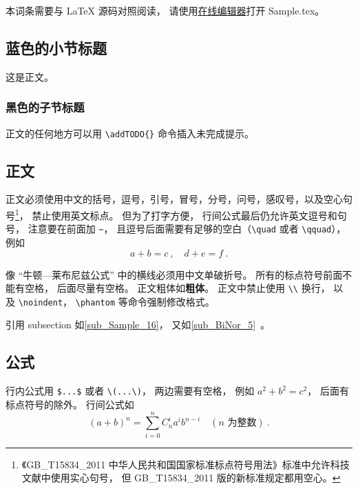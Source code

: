 
\begin{issues}
\issueDraft       %
\issueTODO        %
\issueMissDepend  %
\issueAbstract    %
\issueNeedCite    %
\end{issues}


本词条需要与 LaTeX 源码对照阅读， 请使用\href{https://wuli.wiki/editor}{在线编辑器}打开 Sample.tex。

\subsection{蓝色的小节标题}
这是正文。
\subsubsection{黑色的子节标题}
正文的任何地方可以用 \verb|\addTODO{}| 命令插入未完成提示。

\subsection{正文}\label{sub_Sample_16}
正文必须使用中文的括号，逗号，引号，冒号，分号，问号，感叹号，以及空心句号\footnote{《GB\_T15834\_2011 中华人民共和国国家标准标点符号用法》标准中允许科技文献中使用实心句号， 但 GB\_T15834\_2011 版的新标准规定都用空心。}， 禁止使用英文标点。 但为了打字方便， 行间公式最后仍允许英文逗号和句号， 注意要在前面加 \verb|~|， 且逗号后面需要有足够的空白（\verb|\quad| 或者 \verb|\qquad|）， 例如
\begin{equation}\label{eq_Sample_2}
a + b = c~, \quad d + e = f~.
\end{equation}

像 “牛顿—莱布尼兹公式” 中的横线必须用中文单破折号。 所有的标点符号前面不能有空格， 后面尽量有空格。 正文粗体如\textbf{粗体}。 正文中禁止使用 \verb|\\| 换行， 以及 \verb|\noindent|， \verb|\phantom| 等命令强制修改格式。

引用 subsection 如\autoref{sub_Sample_16}， 又如\autoref{sub_BiNor_5}~。

\subsection{公式}
行内公式用 \verb|$...$| 或者 \verb|\(...\)|， 两边需要有空格， 例如 $a^2+b^2=c^2$， 后面有标点符号的除外。 行间公式如
\begin{equation}\label{eq_Sample_1}
(a+b)^n = \sum_{i=0}^n C_n^i a^i b^{n-i} \quad (\text{$n$ 为整数})~.
\end{equation}

